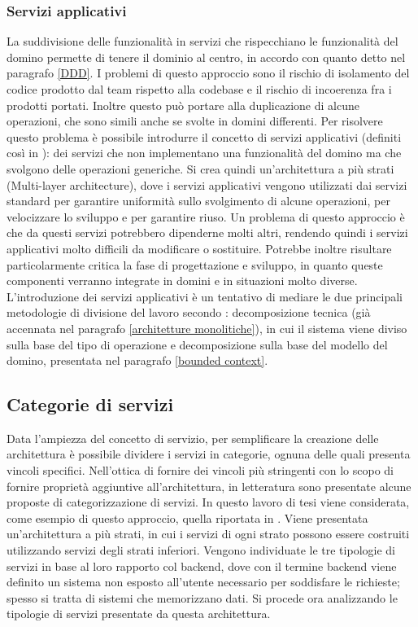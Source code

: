 \documentclass[a4paper,12pt]{report}
\begin{document}
\subsubsection{Servizi applicativi}\label{servizi applicativi}
La suddivisione delle funzionalità in servizi che rispecchiano le funzionalità del domino permette di tenere il dominio al centro, in accordo con quanto detto nel paragrafo \ref{DDD}. 
I problemi di questo approccio sono il rischio di isolamento del codice prodotto dal team rispetto alla codebase e il rischio di incoerenza fra i prodotti portati.
Inoltre questo può portare alla duplicazione di alcune operazioni, che sono simili anche se svolte in domini differenti.
Per risolvere questo problema è possibile introdurre il concetto di servizi applicativi (definiti così in \cite{erl_service-oriented}): dei servizi che non implementano una funzionalità del domino ma che svolgono delle operazioni generiche.
Si crea quindi un'architettura a più strati (Multi-layer architecture), dove i servizi applicativi vengono utilizzati dai servizi standard per garantire uniformità sullo svolgimento di alcune operazioni, per velocizzare lo sviluppo e per garantire riuso.
Un problema di questo approccio è che da questi servizi potrebbero dipenderne molti altri, rendendo quindi i servizi applicativi molto difficili da modificare o sostituire.
Potrebbe inoltre risultare particolarmente critica la fase di progettazione e sviluppo, in quanto queste componenti verranno integrate in domini e in situazioni molto diverse.
L'introduzione dei servizi applicativi è un tentativo di mediare le due principali metodologie di divisione del lavoro secondo \cite{richards_fundamentals_2020}: decomposizione tecnica (già accennata nel paragrafo \ref{architetture monolitiche}), in cui il sistema viene diviso sulla base del tipo di operazione e decomposizione sulla base del modello del domino, presentata nel paragrafo \ref{bounded context}.

\subsection{Categorie di servizi}
Data l'ampiezza del concetto di servizio, per semplificare la creazione delle architettura è possibile dividere i servizi in categorie, ognuna delle quali presenta vincoli specifici.
Nell'ottica di fornire dei vincoli più stringenti con lo scopo di fornire proprietà aggiuntive all'architettura, in letteratura sono presentate alcune proposte di categorizzazione di servizi. 
In questo lavoro di tesi viene considerata, come esempio di questo approccio, quella riportata in \cite {erl_service-oriented}.
Viene presentata un'architettura a più strati, in cui i servizi di ogni strato possono essere costruiti utilizzando servizi degli strati inferiori.
Vengono individuate le tre tipologie di servizi in base al loro rapporto col backend, dove con il termine backend viene definito un sistema non esposto all'utente necessario per soddisfare le richieste; spesso si tratta di sistemi che memorizzano dati.
Si procede ora analizzando le tipologie di servizi presentate da questa architettura.
\end{document}

